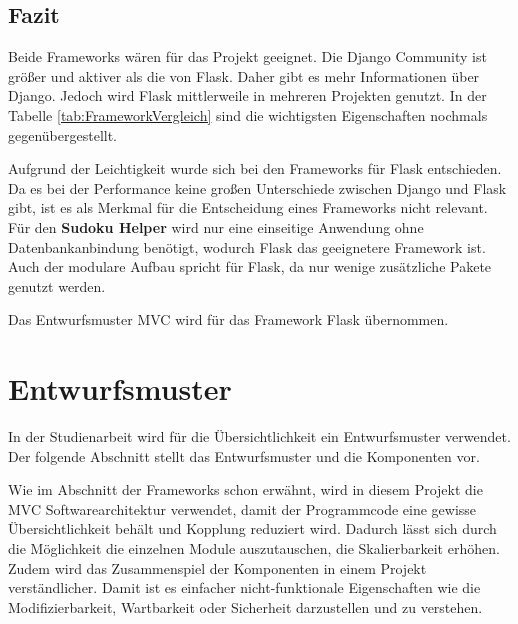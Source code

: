 \subsection{Fazit}
Beide Frameworks wären für das Projekt geeignet. Die Django Community ist größer und aktiver als die von Flask. Daher gibt es mehr Informationen über Django. Jedoch wird Flask mittlerweile in mehreren Projekten genutzt. In der Tabelle \ref{tab:FrameworkVergleich} sind die wichtigsten Eigenschaften nochmals gegenübergestellt. 

\begin{table}[htbp]
	\centering
	\caption{Vergleich der Frameworks Django und Flask}
	\label{tab:FrameworkVergleich}
\end{table}

Aufgrund der Leichtigkeit wurde sich bei den Frameworks für Flask entschieden. Da es bei der Performance keine großen Unterschiede zwischen Django und Flask gibt, ist es als Merkmal für die Entscheidung eines Frameworks nicht relevant. Für den \textbf{Sudoku Helper} wird nur eine einseitige Anwendung ohne Datenbankanbindung benötigt, wodurch Flask das geeignetere Framework ist. Auch der modulare Aufbau spricht für Flask, da nur wenige zusätzliche Pakete genutzt werden. 

Das Entwurfsmuster \ac{MVC} wird für das Framework Flask übernommen.

\section{Entwurfsmuster}
In der Studienarbeit wird für die Übersichtlichkeit ein Entwurfsmuster verwendet. Der folgende Abschnitt stellt das Entwurfsmuster und die Komponenten vor.

Wie im Abschnitt der Frameworks schon erwähnt, wird in diesem Projekt die \ac{MVC} Softwarearchitektur verwendet, damit der Programmcode eine gewisse Übersichtlichkeit behält und Kopplung reduziert wird. Dadurch lässt sich durch die Möglichkeit die einzelnen Module auszutauschen, die Skalierbarkeit erhöhen. Zudem wird das Zusammenspiel der Komponenten in einem Projekt verständlicher. Damit ist es einfacher nicht-funktionale Eigenschaften wie die Modifizierbarkeit, Wartbarkeit oder Sicherheit darzustellen und zu verstehen.  \cite[57\psq]{musch2021design}

